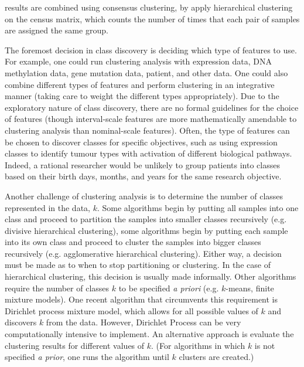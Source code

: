 results are combined using consensus clustering, by apply hierarchical clustering on the census matrix, which counts the number of times that each pair of samples are assigned the same group.

The foremost decision in class discovery is deciding which type of features to use. For example, one could run clustering analysis with expression data, DNA methylation data, gene mutation data, patient, and other data. One could also combine different types of features and perform clustering in an integrative manner (taking care to weight the different types appropriately). Due to the exploratory nature of class discovery, there are no formal guidelines for the choice of features (though interval-scale features are more mathematically amendable to clustering analysis than nominal-scale features). Often, the type of features can be chosen to discover classes for specific objectives, such as using expression classes to identify tumour types with activation of different biological pathways. Indeed, a rational researcher would be unlikely to group patients into classes based on their birth days, months, and years for the same research objective. 

Another challenge of clustering analysis is to determine the number of classes represented in the data, $k$. Some algorithms begin by putting all samples into one class and proceed to partition the samples into smaller classes recursively (e.g. divisive hierarchical clustering), some algorithms begin by putting each sample into its own class and proceed to cluster the samples into bigger classes recursively (e.g. agglomerative hierarchical clustering). Either way, a decision must be made as to when to stop partitioning or clustering. In the case of hierarchical clustering, this decision is usually made informally. Other algorithms require the number of classes $k$ to be specified \emph{a priori} (e.g. $k$-means, finite mixture models). One recent algorithm that circumvents this requirement is Dirichlet process mixture model, which allows for all possible values of $k$ and discovers $k$ from the data. However, Dirichlet Process can be very computationally intensive to implement. An alternative approach is evaluate the clustering results for different values of $k$. (For algorithms in which $k$ is not specified \emph{a prior}, one runs the algorithm until $k$ clusters are created.)

